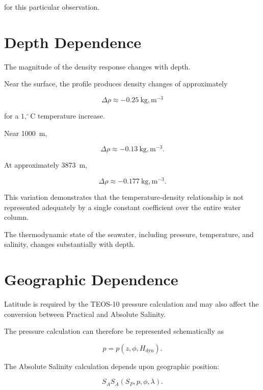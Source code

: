 \documentclass[11pt]{article}
\begin{document}
for this particular observation.

\section{Depth Dependence}

The magnitude of the density response changes with depth.

Near the surface, the profile produces density changes of approximately

\begin{equation}
\Delta\rho
\approx
-0.25\ \mathrm{kg,m^{-3}}
\end{equation}

for a $1,^\circ\mathrm{C}$ temperature increase.

Near \SI{1000}{m},

\begin{equation}
\Delta\rho
\approx
-0.13\ \mathrm{kg,m^{-3}}.
\end{equation}

At approximately \SI{3873}{m},

\begin{equation}
\Delta\rho
\approx
-0.177\ \mathrm{kg,m^{-3}}.
\end{equation}

This variation demonstrates that the temperature-density relationship
is not represented adequately by a single constant coefficient over the
entire water column.

The thermodynamic state of the seawater, including pressure,
temperature, and salinity, changes substantially with depth.

\section{Geographic Dependence}

Latitude is required by the TEOS-10 pressure calculation and may also
affect the conversion between Practical and Absolute Salinity.

The pressure calculation can therefore be represented schematically as

\begin{equation}
p=p(z,\phi,H_{\mathrm{dyn}}).
\end{equation}

The Absolute Salinity calculation depends upon geographic position:

\begin{equation}
S_A
S_A(S_P,p,\phi,\lambda).
\end{equation}
\end{document}
